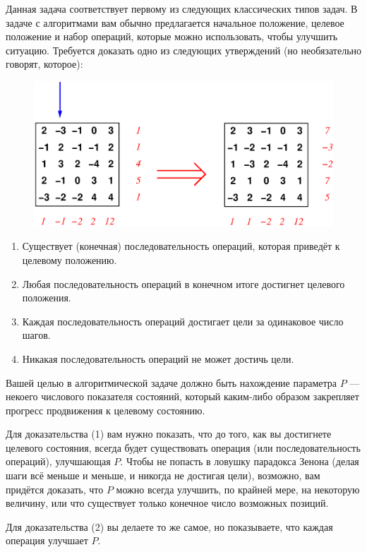 Данная задача соответствует первому из следующих классических типов задач.
В задаче с алгоритмами вам обычно предлагается начальное положение, целевое положение и набор операций, которые можно использовать, чтобы улучшить ситуацию.
Требуется доказать одно из следующих утверждений (но необязательно говорят, которое):
\begin{figure}
\centering
\includegraphics[scale=0.6]{Figs/Algorithms/array}
\end{figure}
\begin{enumerate}[(1)]
\item Существует (конечная) последовательность операций, которая приведёт к целевому положению.
\item Любая последовательность операций в конечном итоге достигнет целевого положения.
\item Каждая последовательность операций достигает цели за одинаковое число шагов.
\item Никакая последовательность операций не может достичь цели.
\end{enumerate}

Вашей целью в алгоритмической задаче должно быть нахождение параметра $P$ --- некоего числового показателя состояний, который каким-либо образом закрепляет прогресс продвижения к целевому состоянию.

Для доказательства (1) вам нужно показать, что до того, как вы достигнете целевого состояния, всегда будет существовать операция (или последовательность операций), улучшающая $P$.
Чтобы не попасть в ловушку парадокса Зенона (делая шаги всё меньше и меньше, и никогда не достигая цели), возможно, вам придётся доказать, что $P$ можно всегда улучшить, по крайней мере, на некоторую величину, или что существует только конечное число возможных позиций.

Для доказательства (2) вы делаете то же самое, но показываете, что каждая операция улучшает $P$.


